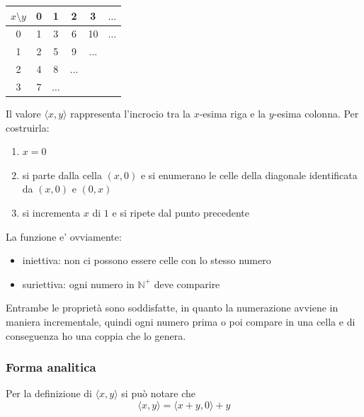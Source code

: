 \begin{center}
	\begin{minipage}[h]{0.45\textwidth}
		{\renewcommand{\arraystretch}{1.3}
			\begin{tabular}{c | c c c c c}
				$x\setminus y$ & 0 & 1 & 2 & 3 & $\dots$ \\ 
				\hline
				0 & 1 & 3 & 6 & 10 & $\dots$ \\
				1 & 2 & 5 & 9 & $\dots$ & \\
				2 & 4 & 8 & $\dots$ && \\
				3 & 7 & $\dots$ &&& \\
		\end{tabular}}
	\end{minipage}
	\hfill 
	\begin{minipage}[h]{0.45\textwidth}
		
	\end{minipage}
\end{center}

Il valore $\langle x,y \rangle$ rappresenta l'incrocio tra la $x$-esima riga e la $y$-esima colonna. Per costruirla:
\begin{enumerate}
	\item $x = 0$
	\item si parte dalla cella $(x,0)$ e si enumerano le celle della diagonale identificata da $(x,0)$ e $(0,x)$
	\item si incrementa $x$ di $1$ e si ripete dal punto precedente
\end{enumerate}

La funzione e' ovviamente:
\begin{itemize}
	\item iniettiva: non ci possono essere celle con lo stesso numero
	\item suriettiva: ogni numero in $\mathbb{N}^+$ deve comparire
\end{itemize}
Entrambe le proprietà sono soddisfatte, in quanto la numerazione avviene in maniera incrementale, quindi ogni numero prima o poi compare in una cella e di conseguenza ho una coppia che lo genera.

\subsubsection{Forma analitica} 
Per la definizione di $\langle x,y \rangle$ si può notare che
$$ \langle x,y \rangle = \langle x + y,0 \rangle + y $$

\begin{center}
	
\end{center}

